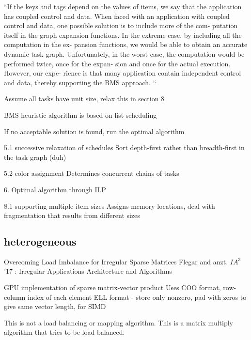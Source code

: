 \documentclass{article}
\begin{document}
“If the keys and tags depend on the values of items, we say that the application has coupled control and data. 
When faced with an application with coupled control and data, one possible solution is to include more of the com- putation itself in the graph expansion functions. In the extreme case, by including all the computation in the ex- pansion functions, we would be able to obtain an accurate dynamic task graph. Unfortunately, in the worst case, the computation would be performed twice, once for the expan- sion and once for the actual execution. However, our expe- rience is that many application contain independent control and data, thereby supporting the BMS approach. “

Assume all tasks have unit size, relax this in section 8

BMS heuristic algorithm is based on list scheduling

If no acceptable solution is found, run the optimal algorithm

5.1 successive relaxation of schedules
Sort depth-first rather than breadth-first in the task graph (duh)

5.2 color assignment
Determines concurrent chains of tasks

6. Optimal algorithm through ILP

8.1 supporting multiple item sizes
Assigns memory locations, deal with fragmentation that results from different sizes




\subsection{heterogeneous}

\cite{Flegar:2017:OLI:3149704.3149767}



Overcoming Load Imbalance for Irregular Sparse Matrices 
Flegar and anzt. $IA^3$ ’17 : Irregular Applications Architecture and Algorithms

GPU implementation of sparse matrix-vector product
Uses COO format, row-column index of each element
ELL format - store only nonzero, pad with zeros to give same vector length, for SIMD

This is not a load balancing or mapping algorithm.  This is a matrix multiply algorithm that tries to be load balanced.


\bigskip

\cite{8082085}

\bigskip
\end{document}
